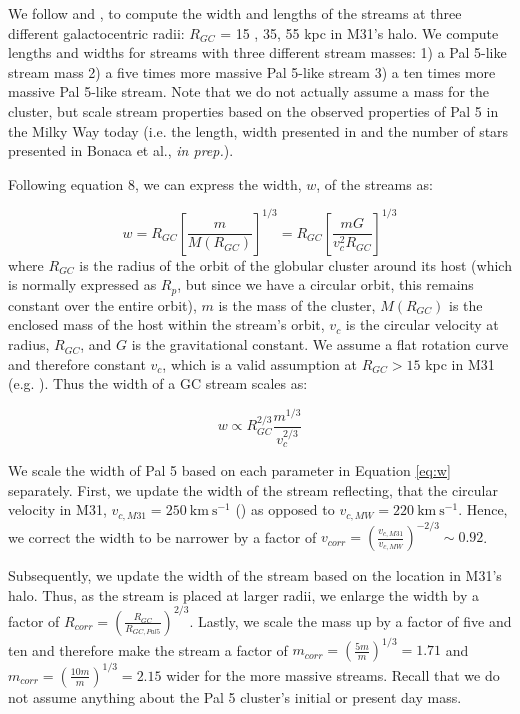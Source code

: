 \documentclass[twocolumn]{aastex62}
\newcommand{\kms}{\ensuremath{\textrm{km}~\textrm{s}^{-1}}}
\begin{document}
We follow \citet{johnston98} and \citet{johnston01}, to compute the width and lengths of the streams at three different galactocentric radii: $R_{GC}$ = 15 , 35, 55 kpc in M31's halo. We compute lengths and widths for streams with three different stream masses: 1) a Pal 5-like stream mass 2) a five times more massive Pal 5-like stream 3) a ten times more massive Pal 5-like stream. Note that we do not actually assume a mass for the cluster, but scale stream properties based on the observed properties of Pal 5 in the Milky Way today (i.e. the length, width presented in \citealt{ibata16} and the number of stars presented in Bonaca et al., {\it in prep.}).  

Following \citet{johnston01} equation 8, we can express the width, $w$, of the streams as:

\begin{equation}
w = R_{GC} \left[\frac{m}{M(R_{GC})}\right]^{1/3} = R_{GC} \left[\frac{m G}{v_c^2 R_{GC}}\right]^{1/3} 
\end{equation}
where $R_{GC}$ is the radius of the orbit of the globular cluster around its host (which is normally expressed as $R_p$, but since we have a circular orbit, this remains constant over the entire orbit), $m$ is the mass of the cluster, $M(R_{GC})$ is the enclosed mass of the host within the stream's orbit, $v_c$ is the circular velocity at radius, $R_{GC}$, and $G$ is the gravitational constant. We assume a flat rotation curve and therefore constant  $v_c$, which is a valid assumption at $R_{GC} > 15$ kpc in M31 (e.g. \citealt{chemin09}). Thus the width of a GC stream scales as:

\begin{equation}
\label{eq:w}
w \propto R_{GC}^{2/3} \frac{m^{1/3}}{v_c^{2/3}}
\end{equation}

We scale the width of Pal 5 based on each parameter in Equation \ref{eq:w} separately. First, we update the width of the stream reflecting, that the circular velocity in M31, $v_{c, M31}= 250 ~\kms$  (\citealt{chemin09}) as opposed to  $v_{c, MW}= 220 ~\kms$. Hence, we correct the width to be narrower by a factor of $v_{corr} =  \left(\frac{v_{c,M31}}{v_{c,MW}}\right)^{-2/3} \sim 0.92$. 

Subsequently, we update the width of the stream based on the location in M31's halo. Thus, as the stream is placed at larger radii, we enlarge the width by a factor of  $R_{corr} = \left(\frac{R_{GC}}{R_{GC,Pal5}}\right)^{2/3}$. Lastly, we scale the mass up by a factor of five and ten and therefore make the stream a factor of $m_{corr} = \left(\frac{5m}{m}\right)^{1/3}= 1.71$  and $m_{corr} = \left(\frac{10m}{m}\right)^{1/3}= 2.15$ wider for the more massive streams. Recall that we do not assume anything about the Pal 5 cluster's initial or present day mass. 
\end{document}
